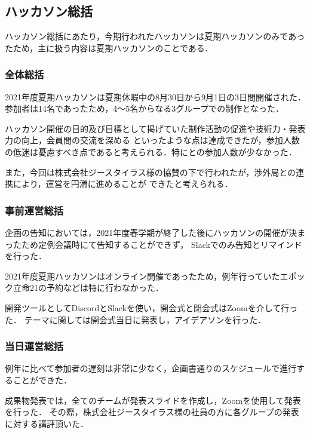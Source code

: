 \subsection*{ハッカソン総括}



ハッカソン総括にあたり，今期行われたハッカソンは夏期ハッカソンのみであったため，主に扱う内容は夏期ハッカソンのことである．

\subsubsection*{全体総括}

2021年度夏期ハッカソンは夏期休暇中の8月30日から9月1日の3日間開催された．参加者は14名であったため，4〜5名からなる3グループでの制作となった．

ハッカソン開催の目的及び目標として掲げていた制作活動の促進や技術力・発表力の向上，会員間の交流を深める
といったような点は達成できたが，参加人数の低迷は憂慮すべき点であると考えられる．特に\firstGrade{}と\secondGrade{}の参加人数が少なかった．

また，今回は株式会社ジースタイラス様の協賛の下で行われたが，渉外局との連携により，運営を円滑に進めることが
できたと考えられる．

\subsubsection*{事前運営総括}

企画の告知においては，2021年度春学期が終了した後にハッカソンの開催が決まったため定例会議時にて告知することができず，
Slackでのみ告知とリマインドを行った．

2021年度夏期ハッカソンはオンライン開催であったため，例年行っていたエポック立命21の予約などは特に行わなかった．

開発ツールとしてDiscordとSlackを使い，開会式と閉会式はZoomを介して行った．
テーマに関しては開会式当日に発表し，アイデアソンを行った．

\subsubsection*{当日運営総括}

例年に比べて参加者の遅刻は非常に少なく，企画書通りのスケジュールで進行することができた．

成果物発表では，全てのチームが発表スライドを作成し，Zoomを使用して発表を行った．
その際，株式会社ジースタイラス様の社員の方に各グループの発表に対する講評頂いた．
